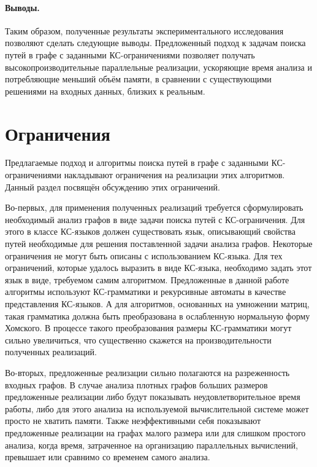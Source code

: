 \paragraph{Выводы.} Таким образом, полученные результаты экспериментального исследования позволяют сделать следующие выводы. Предложенный подход к задачам поиска путей в графе с заданными КС-ограничениями позволяет получать высокопроизводительные параллельные реализации, ускоряющие время анализа и потребляющие меньший объём памяти, в сравнении с существующими решениями на входных данных, близких к реальным.

\section{Ограничения}\label{sec:ch5/sect3}
Предлагаемые подход и алгоритмы поиска путей в графе с заданными КС-ограничениями накладывают ограничения на реализации этих алгоритмов. Данный раздел посвящён обсуждению этих ограничений.

Во-первых, для применения полученных реализаций требуется сформулировать необходимый анализ графов в виде задачи поиска путей с КС-ограничения. Для этого в классе КС-языков должен существовать язык, описывающий свойства путей необходимые для решения поставленной задачи анализа графов. Некоторые ограничения не могут быть описаны с использованием КС-языка. Для тех ограничений, которые удалось выразить в виде КС-языка, необходимо задать этот язык в виде, требуемом самим алгоритмом. Предложенные в данной работе алгоритмы используют КС-грамматики и рекурсивные автоматы в качестве представления КС-языков. А для алгоритмов, основанных на умножении матриц, такая грамматика должна быть преобразована в ослабленную нормальную форму Хомского. В процессе такого преобразования размеры КС-грамматики могут сильно увеличиться, что существенно скажется на производительности полученных реализаций.

Во-вторых, предложенные реализации сильно полагаются на разреженность входных графов. В случае анализа плотных графов больших размеров предложенные реализации либо будут показывать неудовлетворительное время работы, либо для этого анализа на используемой вычислительной системе может просто не хватить памяти. Также неэффективными себя показывают предложенные реализации на графах малого размера или для слишком простого анализа, когда время, затраченное на организацию параллельных вычислений, превышает или сравнимо со временем самого анализа.

